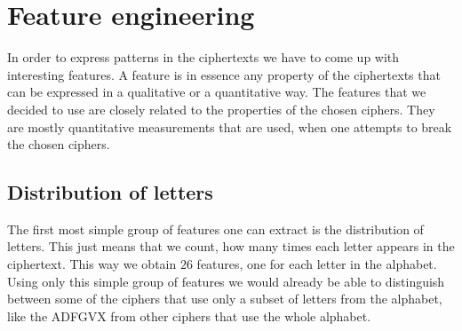 \documentclass[a4paper]{article}
\begin{document}
\section{Feature engineering} \label{features}
In order to express patterns in the ciphertexts we have to come up with interesting features. A feature is in essence any property of the ciphertexts that can be expressed in a qualitative or a quantitative way. The features that we decided to use are closely related to the properties of the chosen ciphers. They are mostly quantitative measurements that are used, when one attempts to break the chosen ciphers.

\subsection{Distribution of letters}
The first most simple group of features one can extract is the distribution of letters. This just means that we count, how many times each letter appears in the ciphertext. This way we obtain $26$ features, one for each letter in the alphabet. Using only this simple group of features we would already be able to distinguish between some of the ciphers that use only a subset of letters from the alphabet, like the ADFGVX from other ciphers that use the whole alphabet.
\end{document}

